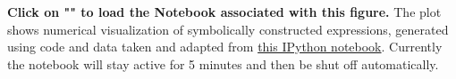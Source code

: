 \textbf{\label{fig:2}} \textbf{Click on "" to load the Notebook associated with this figure.} The plot shows numerical visualization of symbolically constructed expressions, generated using code and data taken and adapted from \href{http://nbviewer.ipython.org/static/img/example-nb/sympy.png}{this IPython notebook}.  Currently the notebook will stay active for 5 minutes and then be shut off automatically.